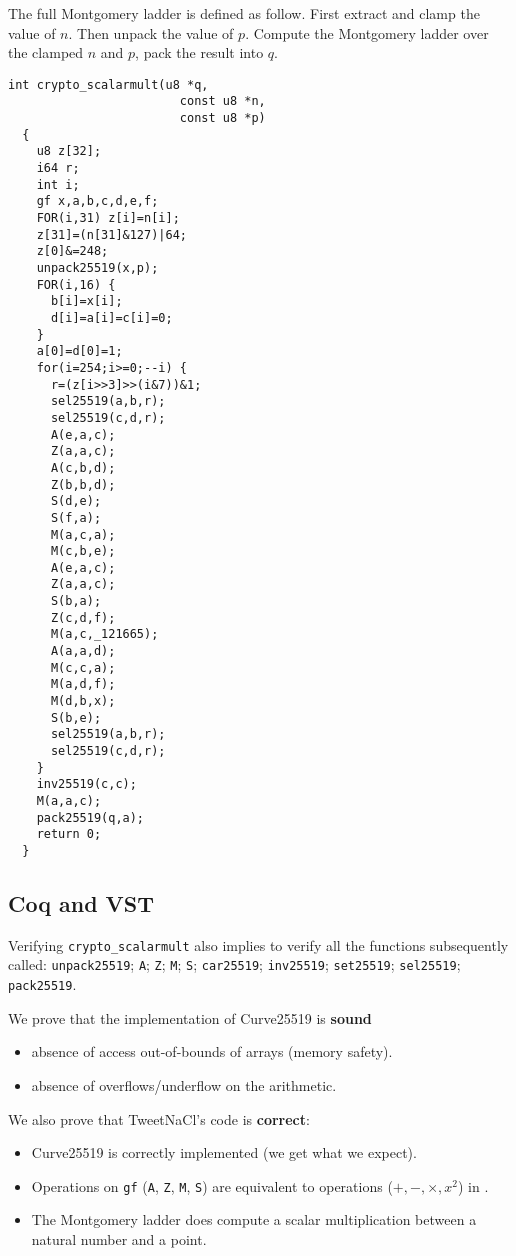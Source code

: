   The full Montgomery ladder is defined as follow.
  First extract and clamp the value of $n$. Then unpack the value of $p$.
  Compute the Montgomery ladder over the clamped $n$ and $p$, pack the result into $q$.
  \begin{lstlisting}[language=Ctweetnacl]
  int crypto_scalarmult(u8 *q,
                        const u8 *n,
                        const u8 *p)
  {
    u8 z[32];
    i64 r;
    int i;
    gf x,a,b,c,d,e,f;
    FOR(i,31) z[i]=n[i];
    z[31]=(n[31]&127)|64;
    z[0]&=248;
    unpack25519(x,p);
    FOR(i,16) {
      b[i]=x[i];
      d[i]=a[i]=c[i]=0;
    }
    a[0]=d[0]=1;
    for(i=254;i>=0;--i) {
      r=(z[i>>3]>>(i&7))&1;
      sel25519(a,b,r);
      sel25519(c,d,r);
      A(e,a,c);
      Z(a,a,c);
      A(c,b,d);
      Z(b,b,d);
      S(d,e);
      S(f,a);
      M(a,c,a);
      M(c,b,e);
      A(e,a,c);
      Z(a,a,c);
      S(b,a);
      Z(c,d,f);
      M(a,c,_121665);
      A(a,a,d);
      M(c,c,a);
      M(a,d,f);
      M(d,b,x);
      S(b,e);
      sel25519(a,b,r);
      sel25519(c,d,r);
    }
    inv25519(c,c);
    M(a,a,c);
    pack25519(q,a);
    return 0;
  }
  \end{lstlisting}

\subsection{Coq and VST}



Verifying \texttt{crypto\_scalarmult} also implies to verify all the functions
subsequently called: \texttt{unpack25519}; \texttt{A}; \texttt{Z}; \texttt{M};
\texttt{S}; \texttt{car25519}; \texttt{inv25519}; \texttt{set25519}; \texttt{sel25519};
\texttt{pack25519}.

We prove that the implementation of Curve25519 is \textbf{sound} \ie
\begin{itemize}
\item absence of access out-of-bounds of arrays (memory safety).
\item absence of overflows/underflow on the arithmetic.
\end{itemize}
We also prove that TweetNaCl's code is \textbf{correct}:
\begin{itemize}
\item Curve25519 is correctly implemented (we get what we expect).
\item Operations on \texttt{gf} (\texttt{A}, \texttt{Z}, \texttt{M}, \texttt{S})
are equivalent to operations ($+,-,\times,x^2$) in \Zfield.
\item The Montgomery ladder does compute a scalar multiplication between a natural number and a point.
\end{itemize}

